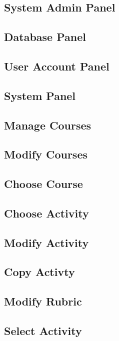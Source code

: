 \documentclass{article}
\begin{document}
\subsection{System Admin Panel}

\subsection{Database Panel}

\subsection{User Account Panel}

\subsection{System Panel}

\subsection{Manage Courses}

\subsection{Modify Courses}

\subsection{Choose Course}

\subsection{Choose Activity}

\subsection{Modify Activity}

\subsection{Copy Activty}

\subsection{Modify Rubric}

\subsection{Select Activity}
\end{document}
